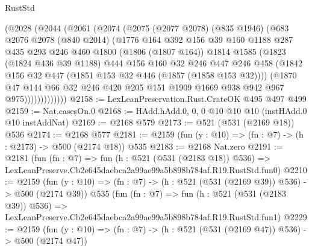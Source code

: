 \begin{lexlean}{RustStd}
\begin{coremodule}
            (@2028
              (@2044
                (@2061
                  (@2074
                    (@2075
                      (@2077 @2078)
                      (@835 @1946)
                      (@683
                        @2076
                        @2078
                        (@840 @2014)
                        (@1776
                          @164
                          @392
                          @156
                          @39
                          @160
                          @1188
                          @287
                          @435
                          @293
                          @246
                          @460
                          @1800
                          (@1806 (@1807 @164))
                          @1814
                          @1585
                          (@1823
                            (@1824 @436 @39 @1188)
                            @444
                            @156
                            @160
                            @32
                            @246
                            @447
                            @246
                            @458
                            (@1842 @156 @32 @447 (@1851 @153 @32 @446 (@1857 (@1858 @153 @32))))
                            (@1870
                              @47
                              @144
                              @66
                              @32
                              @246
                              @420
                              @205
                              @151
                              @1909
                              @1669
                              @938
                              @942
                              @967
                              @975)))))))))))))
@2158 := LexLeanPreservation.Rust.CrateOK @495 @497 @499
@2159 := Nat.casesOn.{0}
@2168 := HAdd.hAdd.{0, 0, 0} @10 @10 @10 (instHAdd.{0} @10 instAddNat)
@2169 := @2168 @579
@2173 := @521 (@531 (@2169 @18)) @536
@2174 := @2168 @577
@2181 := @2159 (fun (y : @10) => (fn : @7) -> (h : @2173) -> @500 (@2174 @18)) @535
@2183 := @2168 Nat.zero
@2191 := @2181
    (fun (fn : @7) =>
    fun (h : @521 (@531 (@2183 @18)) @536) =>
    LexLeanPreserve.Cb2e645daebca2a99ae99a5b898b784af.R19.RustStd.fun0)
@2210 := @2159
    (fun (y : @10) => (fn : @7) -> (h : @521 (@531 (@2169 @39)) @536) -> @500 (@2174 @39))
    @535
    (fun (fn : @7) =>
    fun (h : @521 (@531 (@2183 @39)) @536) =>
    LexLeanPreserve.Cb2e645daebca2a99ae99a5b898b784af.R19.RustStd.fun1)
@2229 := @2159
    (fun (y : @10) => (fn : @7) -> (h : @521 (@531 (@2169 @47)) @536) -> @500 (@2174 @47))

\end{coremodule}
\end{lexlean}
